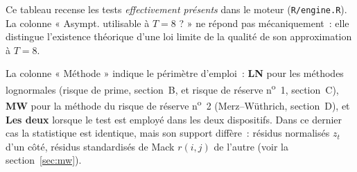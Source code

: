 \documentclass[a4paper,11pt]{article}
\newcommand{\code}[1]{\texttt{\small #1}}
\begin{document}
Ce tableau recense les tests \emph{effectivement présents} dans le moteur
(\code{R/engine.R}). La colonne « Asympt. utilisable à $T = 8$ ? » ne répond pas
mécaniquement~: elle distingue l'existence théorique d'une loi limite de la
qualité de son approximation à $T = 8$.

La colonne « Méthode » indique le périmètre d'emploi~: \textbf{LN} pour les
méthodes lognormales (risque de prime, section~B, et risque de réserve
n\textsuperscript{o}~1, section~C), \textbf{MW} pour la méthode du risque de
réserve n\textsuperscript{o}~2 (Merz--Wüthrich, section~D), et
\textbf{Les deux} lorsque le test est employé dans les deux dispositifs. Dans ce
dernier cas la statistique est identique, mais son support diffère~: résidus
normalisés $z_t$ d'un côté, résidus standardisés de Mack $r(i,j)$ de l'autre
(voir la section~\ref{sec:mw}).
\end{document}
